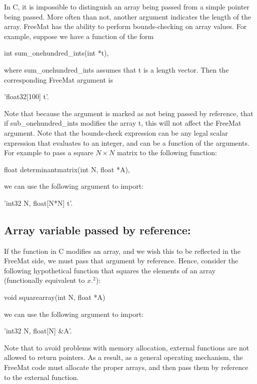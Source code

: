 In {\ttfamily C}, it is impossible to distinguish an array being passed from a simple pointer being passed. More often than not, another argument indicates the length of the array. Free\-Mat has the ability to perform bounds-\/checking on array values. For example, suppose we have a function of the form \begin{DoxyVerb}  int sum_onehundred_ints(int *t),
\end{DoxyVerb}
 where {\ttfamily sum\-\_\-onehundred\-\_\-ints} assumes that {\ttfamily t} is a length {} vector. Then the corresponding Free\-Mat argument is \begin{DoxyVerb}  'float32[100] t'.
\end{DoxyVerb}
 Note that because the argument is marked as not being passed by reference, that if {\ttfamily sub\-\_\-onehundred\-\_\-ints} modifies the array {\ttfamily t}, this will not affect the Free\-Mat argument. Note that the bounds-\/check expression can be any legal scalar expression that evaluates to an integer, and can be a function of the arguments. For example to pass a square $N \times N$ matrix to the following function\-: \begin{DoxyVerb}  float determinantmatrix(int N, float *A),
\end{DoxyVerb}
 we can use the following argument to {\ttfamily import}\-: \begin{DoxyVerb}  'int32 N, float[N*N] t'.
\end{DoxyVerb}


\subsection*{Array variable passed by reference\-:}

If the function in {\ttfamily C} modifies an array, and we wish this to be reflected in the Free\-Mat side, we must pass that argument by reference. Hence, consider the following hypothetical function that squares the elements of an array (functionally equivalent to $x.^2$)\-: \begin{DoxyVerb}  void squarearray(int N, float *A)
\end{DoxyVerb}
 we can use the following argument to {\ttfamily import}\-: \begin{DoxyVerb}  'int32 N, float[N] &A'.
\end{DoxyVerb}
 Note that to avoid problems with memory allocation, external functions are not allowed to return pointers. As a result, as a general operating mechanism, the Free\-Mat code must allocate the proper arrays, and then pass them by reference to the external function.

